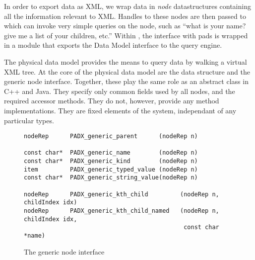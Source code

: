 




In order to export \pads data as XML, we wrap data in {\em node}
datastructures containing all the information relevant to XML. Handles
to these nodes are then passed to \galax which can invoke very simple
queries on the node, such as ``what is your name? give me a list of
your children, etc.''  Within \galax, the interface with pads is
wrapped in a module that exports the \galax Data Model interface to
the \galax query engine.

The physical data model provides the means to query \pads data by
walking a virtual XML tree.  At the core of the physical data model
are the  data structure and the generic node interface.
Together, these play the same role as an abstract class in C++ and
Java. They specify only common fields used by all nodes, and the
required accessor methods. They do not, however, provide any method
implementations. They are fixed elements of the system, independant of
any particular \pads{} types.

\begin{figure*}
{\small
\begin{verbatim}
nodeRep      PADX_generic_parent      (nodeRep n)

const char*  PADX_generic_name        (nodeRep n)
const char*  PADX_generic_kind        (nodeRep n)
item         PADX_generic_typed_value (nodeRep n)
const char*  PADX_generic_string_value(nodeRep n)

nodeRep      PADX_generic_kth_child         (nodeRep n, childIndex idx)
nodeRep      PADX_generic_kth_child_named   (nodeRep n, childIndex idx, 
                                             const char *name)
\end{verbatim}
}
\caption{The generic node interface}
\label{fig:generic-node-interface}
\end{figure*}

